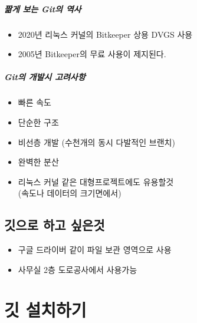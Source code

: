 \documentclass[12pt, a4paper, oneside]{book}
\let\stdsection\section
\renewcommand\section{\newpage\stdsection}
\begin{document}
	\paragraph{짦게 보는 Git의 역사}

			\begin{itemize}
			\item 	2020년 리눅스 커널의 Bitkeeper 상용 DVGS 사용
			\item 	2005년 Bitkeeper의 무료 사용이 제지된다.
			\end{itemize}

							
	\paragraph{Git의 개발시 고려사항}


			\begin{itemize}
			\item 	빠른 속도
			\item 	단순한 구조
			\item 	비선층 개발 (수천개의 동시 다발적인 브랜치)
			\item 	완벽한 분산
			\item 	리눅스 커널 같은 대형프로젝트에도 유용할것 \\(속도나 데이터의 크기면에서)
			\end{itemize}



%										
	\section{ 깃으로 하고 싶은것}

			\begin{itemize}
			\item 	구글 드라이버 같이 파일 보관 영역으로 사용
			\item 	사무실 2층 도로공사에서 사용가능
			\end{itemize}






%	
	\chapter 	{깃 설치하기}
\end{document}
